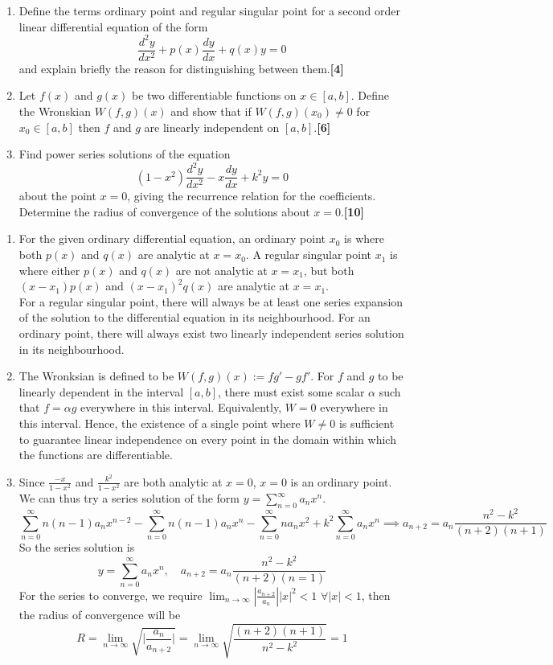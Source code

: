 \documentclass[a4paper]{article}
\begin{document}
\newpage
\begin{qns}\leavevmode
\begin{enumerate}[label=(\alph*)]
\item Define the terms ordinary point and regular singular point for a second order linear differential equation of the form
$$\frac{d^2y}{dx^2}+p(x)\frac{dy}{dx}+q(x)y=0$$
and explain briefly the reason for distinguishing between them.\hfill\textbf{[4]}
\item Let $f(x)$ and $g(x)$ be two differentiable functions on $x\in[a,b]$. Define the Wronskian $W(f, g)(x)$ and show that if $W(f, g)(x_0)\neq 0$ for $x_0\in[a,b]$ then $f$ and $g$ are linearly independent on $[a, b]$.\hfill\textbf{[6]}
\item Find power series solutions of the equation
$$(1-x^2)\frac{d^2y}{dx^2}-x\frac{dy}{dx}+k^2y=0$$
about the point $x = 0$, giving the recurrence relation for the coefficients. Determine the radius of convergence of the solutions about $x = 0$.\hfill\textbf{[10]}
\end{enumerate}
\end{qns}
\begin{ans}\leavevmode
\begin{enumerate}[label=(\alph*)]
\item For the given ordinary differential equation, an ordinary point $x_0$ is where both $p(x)$ and $q(x)$ are analytic at $x=x_0$. A regular singular point $x_1$ is where either $p(x)$ and $q(x)$ are not analytic at $x=x_1$, but both $(x-x_1)p(x)$ and $(x-x_1)^2q(x)$ are analytic at $x=x_1$.\\[5pt]
For a regular singular point, there will always be at least one series expansion of the solution to the differential equation in its neighbourhood. For an ordinary point, there will always exist two linearly independent series solution in its neighbourhood.
\item The Wronksian is defined to be $W(f,g)(x):=fg'-gf'$. For $f$ and $g$ to be linearly dependent in the interval $[a,b]$, there must exist some scalar $\alpha$ such that $f=\alpha g$ everywhere in this interval. Equivalently, $W=0$ everywhere in this interval. Hence, the existence of a single point where $W\neq 0$ is sufficient to guarantee linear independence on every point in the domain within which the functions are differentiable.
\item Since $\frac{-x}{1-x^2}$ and $\frac{k^2}{1-x^2}$ are both analytic at $x=0$, $x=0$ is an ordinary point. We can thus try a series solution of the form $y=\sum_{n=0}^\infty a_nx^n$.
$$\sum_{n=0}^\infty n(n-1)a_nx^{n-2}-\sum_{n=0}^\infty n(n-1)a_nx^n-\sum_{n=0}^\infty na_nx^2+k^2\sum_{n=0}^\infty a_nx^n\implies a_{n+2}=a_n\frac{n^2-k^2}{(n+2)(n+1)}$$
So the series solution is
$$y=\sum_{n=0}^\infty a_nx^n,\quad a_{n+2}=a_n\frac{n^2-k^2}{(n+2)(n=1)}$$
For the series to converge, we require $\lim_{n\rightarrow\infty}|\frac{a_{n+2}}{a_n}||x|^2<1$ $\forall|x|<1$, then the radius of convergence will be
$$R=\lim_{n\rightarrow\infty}\sqrt{\bigg|\frac{a_n}{a_{n+2}}\bigg|}=\lim_{n\rightarrow\infty}\sqrt{\frac{(n+2)(n+1)}{n^2-k^2}}=1$$
\end{enumerate}
\end{ans}
\end{document}
